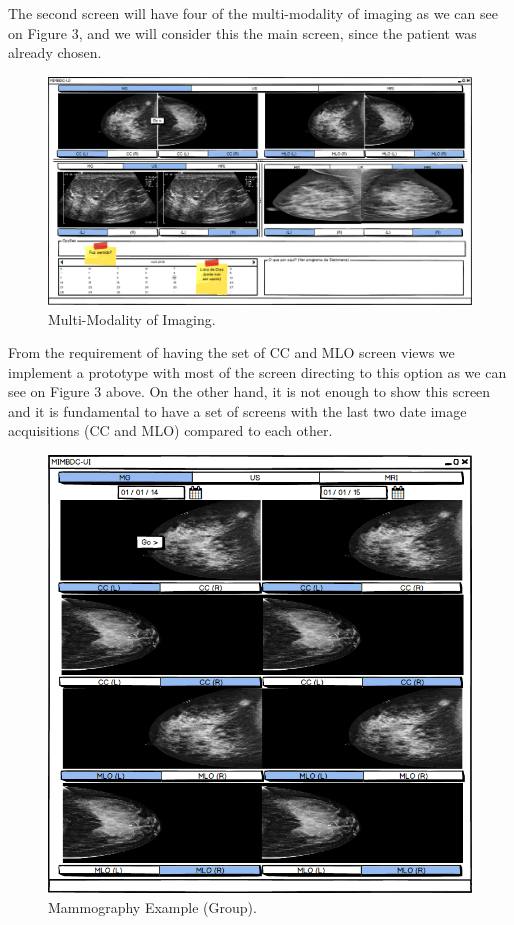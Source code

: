 \clearpage

The second screen will have four of the multi-modality of imaging as we can see on Figure 3, and we will consider this the main screen, since the patient was already chosen.

\begin{figure}[!hbt]
\centering
\includegraphics[width=1.00\textwidth]{multimodalidade.png}
\caption{\label{MMI}Multi-Modality of Imaging.
}
\end{figure}

\clearpage

From the requirement of having the set of CC and MLO screen views we implement a prototype with most of the screen directing to this option as we can see on Figure 3 above. On the other hand, it is not enough to show this screen and it is fundamental to have a set of screens with the last two date image acquisitions (CC and MLO) compared to each other.

\begin{figure}[!hbt]
\centering
\includegraphics[width=1.00\textwidth]{MG_(Group).png}
\caption{\label{fig:PTM}Mammography Example (Group).
}
\end{figure}

